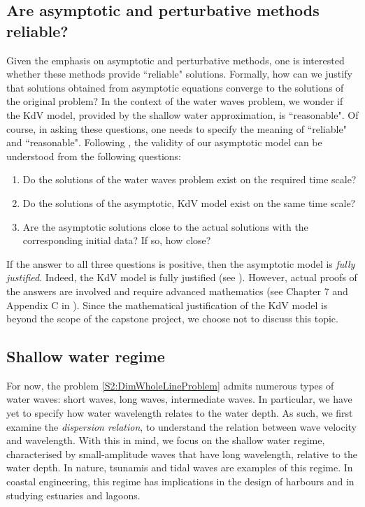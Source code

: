 \documentclass[11pt,reqno,oneside,a4paper]{article}
\begin{document}
\subsection{Are asymptotic and perturbative methods reliable?}
Given the emphasis on asymptotic and perturbative methods, one is interested whether these methods provide ``reliable" solutions. Formally, how can we justify that solutions obtained from asymptotic equations converge to the solutions of the original problem? In the context of the water waves problem, we wonder if the KdV model, provided by the shallow water approximation, is ``reasonable". Of course, in asking these questions, one needs to specify the meaning of ``reliable" and ``reasonable". Following \cite{Lannes}, the validity of our asymptotic model can be understood from the following questions:
\begin{enumerate}
\item Do the solutions of the water waves problem exist on the required time scale?
\item Do the solutions of the asymptotic, KdV model exist on the same time scale?
\item Are the asymptotic solutions close to the actual solutions with the corresponding initial data? If so, how close?
\end{enumerate}
If the answer to all three questions is positive, then the asymptotic model is \textit{fully justified}. Indeed, the KdV model is fully justified (see \cite[p. 297-298]{Lannes}). However, actual proofs of the answers are involved and require advanced mathematics (see Chapter 7 and Appendix C in \cite{Lannes}). Since the mathematical justification of the KdV model is beyond the scope of the capstone project, we choose not to discuss this topic.

\subsection{Shallow water regime} 
For now, the problem \eqref{S2:DimWholeLineProblem} admits numerous types of water waves: short waves, long waves, intermediate waves. In particular, we have yet to specify how water wavelength relates to the water depth. As such, we first examine the \textit{dispersion relation}, to understand the relation between wave velocity and wavelength. With this in mind, we focus on the shallow water regime, characterised by small-amplitude waves that have long wavelength, relative to the water depth. In nature, tsunamis and tidal waves are examples of this regime. In coastal engineering, this regime has implications in the design of harbours and in studying estuaries and lagoons. 
\end{document}
